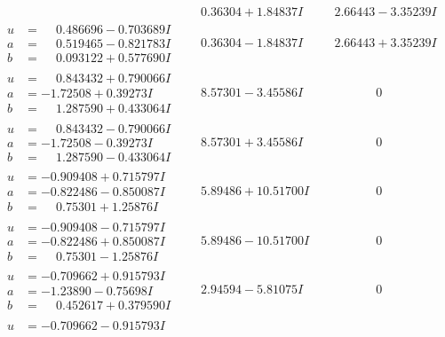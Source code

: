 \documentclass[1p]{elsarticle_modified}
\theoremstyle{definition}
\begin{document}
$$\begin{array}{c|c|c}
 & \phantom{-}0.36304 + 1.84837 I & \phantom{-}2.66443 - 3.35239 I \\ \hline\begin{aligned}
u &= \phantom{-}0.486696 - 0.703689 I \\
a &= \phantom{-}0.519465 - 0.821783 I \\
b &= \phantom{-}0.093122 + 0.577690 I\end{aligned}
 & \phantom{-}0.36304 - 1.84837 I & \phantom{-}2.66443 + 3.35239 I \\ \hline\begin{aligned}
u &= \phantom{-}0.843432 + 0.790066 I \\
a &= -1.72508 + 0.39273 I \\
b &= \phantom{-}1.287590 + 0.433064 I\end{aligned}
 & \phantom{-}8.57301 - 3.45586 I & \phantom{-0.000000 } 0 \\ \hline\begin{aligned}
u &= \phantom{-}0.843432 - 0.790066 I \\
a &= -1.72508 - 0.39273 I \\
b &= \phantom{-}1.287590 - 0.433064 I\end{aligned}
 & \phantom{-}8.57301 + 3.45586 I & \phantom{-0.000000 } 0 \\ \hline\begin{aligned}
u &= -0.909408 + 0.715797 I \\
a &= -0.822486 - 0.850087 I \\
b &= \phantom{-}0.75301 + 1.25876 I\end{aligned}
 & \phantom{-}5.89486 + 10.51700 I & \phantom{-0.000000 } 0 \\ \hline\begin{aligned}
u &= -0.909408 - 0.715797 I \\
a &= -0.822486 + 0.850087 I \\
b &= \phantom{-}0.75301 - 1.25876 I\end{aligned}
 & \phantom{-}5.89486 - 10.51700 I & \phantom{-0.000000 } 0 \\ \hline\begin{aligned}
u &= -0.709662 + 0.915793 I \\
a &= -1.23890 - 0.75698 I \\
b &= \phantom{-}0.452617 + 0.379590 I\end{aligned}
 & \phantom{-}2.94594 - 5.81075 I & \phantom{-0.000000 } 0 \\ \hline\begin{aligned}
u &= -0.709662 - 0.915793 I \\

\end{aligned}
\end{array}$$
\end{document}
